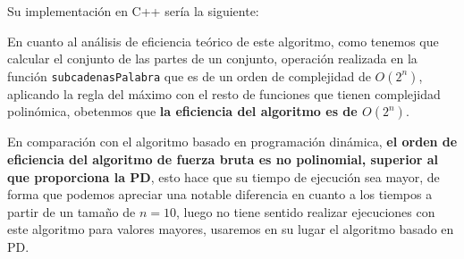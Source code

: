 Su implementación en C++ sería la siguiente:



En cuanto al análisis de eficiencia teórico de este algoritmo, como tenemos que calcular el conjunto de las partes de un conjunto, operación realizada en la función 
\texttt{subcadenasPalabra} que es de un orden de complejidad de $O(2^{n})$, aplicando la regla del máximo con el resto de funciones que tienen complejidad polinómica, obetenmos que \textbf{la eficiencia del algoritmo es de $O(2^{n})$}.

En comparación con el algoritmo basado en programación dinámica, \textbf{el orden de eficiencia del algoritmo de fuerza bruta es no polinomial, superior al que proporciona la PD}, esto hace que su tiempo de ejecución sea mayor, de forma que podemos apreciar una notable diferencia en cuanto a los tiempos a partir de un 
tamaño de $n=10$, luego no tiene sentido realizar ejecuciones con este algoritmo
para valores mayores, usaremos en su lugar el algoritmo basado en PD.

